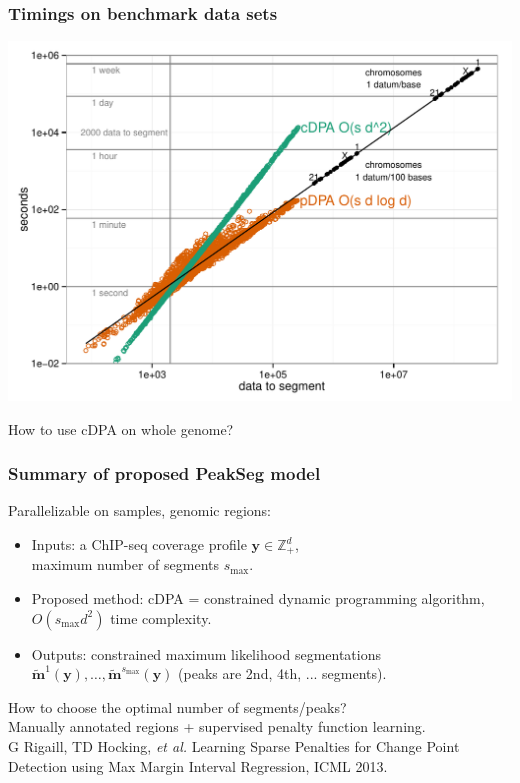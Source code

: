 \documentclass{beamer}
\newcommand{\ZZ}{\mathbb Z}
\begin{document}
\begin{frame}
  \frametitle{Timings on benchmark data sets}
  \includegraphics[width=\textwidth]{figure-cDPA-pDPA-timings}

  How to use cDPA on whole genome?
\end{frame}

\begin{frame}
  \frametitle{Summary of proposed PeakSeg model}
  Parallelizable on samples, genomic regions:
  \begin{itemize}
  \item Inputs: a ChIP-seq coverage profile $\mathbf y\in\ZZ_+^d$,\\
    maximum number of segments $s_{\text{max}}$.
  \item Proposed method: cDPA = constrained 
    dynamic programming
    algorithm,
    $O(s_{\text{max}} d^2)$ time complexity.
  \item Outputs: constrained maximum likelihood segmentations
    $\mathbf{\tilde m}^1(\mathbf y), 
    \dots, 
    \mathbf{\tilde m}^{s_\text{max}}(\mathbf y)$ 
    (peaks are 2nd, 4th, ... segments).
  \end{itemize}
  How to choose the optimal number of segments/peaks?\\
  Manually annotated regions + supervised penalty function learning.\\
  G Rigaill, TD Hocking, \emph{et al.} Learning Sparse Penalties for
  Change Point Detection using Max Margin Interval Regression, ICML
  2013.
\end{frame}
\end{document}
